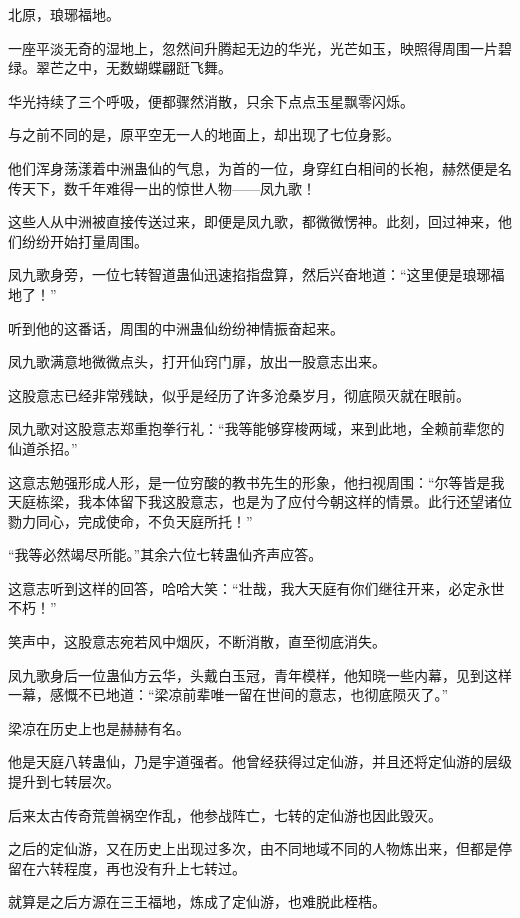 
\begin{this_body}

北原，琅琊福地。

一座平淡无奇的湿地上，忽然间升腾起无边的华光，光芒如玉，映照得周围一片碧绿。翠芒之中，无数蝴蝶翩跹飞舞。

华光持续了三个呼吸，便都骤然消散，只余下点点玉星飘零闪烁。

与之前不同的是，原平空无一人的地面上，却出现了七位身影。

他们浑身荡漾着中洲蛊仙的气息，为首的一位，身穿红白相间的长袍，赫然便是名传天下，数千年难得一出的惊世人物——凤九歌！

这些人从中洲被直接传送过来，即便是凤九歌，都微微愣神。此刻，回过神来，他们纷纷开始打量周围。

凤九歌身旁，一位七转智道蛊仙迅速掐指盘算，然后兴奋地道：“这里便是琅琊福地了！”

听到他的这番话，周围的中洲蛊仙纷纷神情振奋起来。

凤九歌满意地微微点头，打开仙窍门扉，放出一股意志出来。

这股意志已经非常残缺，似乎是经历了许多沧桑岁月，彻底陨灭就在眼前。

凤九歌对这股意志郑重抱拳行礼：“我等能够穿梭两域，来到此地，全赖前辈您的仙道杀招。”

这意志勉强形成人形，是一位穷酸的教书先生的形象，他扫视周围：“尔等皆是我天庭栋梁，我本体留下我这股意志，也是为了应付今朝这样的情景。此行还望诸位勠力同心，完成使命，不负天庭所托！”

“我等必然竭尽所能。”其余六位七转蛊仙齐声应答。

这意志听到这样的回答，哈哈大笑：“壮哉，我大天庭有你们继往开来，必定永世不朽！”

笑声中，这股意志宛若风中烟灰，不断消散，直至彻底消失。

凤九歌身后一位蛊仙方云华，头戴白玉冠，青年模样，他知晓一些内幕，见到这样一幕，感慨不已地道：“梁凉前辈唯一留在世间的意志，也彻底陨灭了。”

梁凉在历史上也是赫赫有名。

他是天庭八转蛊仙，乃是宇道强者。他曾经获得过定仙游，并且还将定仙游的层级提升到七转层次。

后来太古传奇荒兽祸空作乱，他参战阵亡，七转的定仙游也因此毁灭。

之后的定仙游，又在历史上出现过多次，由不同地域不同的人物炼出来，但都是停留在六转程度，再也没有升上七转过。

就算是之后方源在三王福地，炼成了定仙游，也难脱此桎梏。


\end{this_body}
